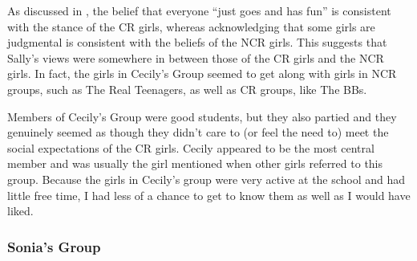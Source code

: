 \label{ex:sallyjudges}

\noindent As discussed in  , the belief that everyone ``just goes and has fun'' is consistent with the stance of the CR girls, whereas acknowledging that some girls are judgmental is consistent with the beliefs of the NCR girls. This suggests that Sally's views were somewhere in between those of the CR girls and the NCR girls.  In fact, the girls in Cecily's Group seemed to get along with girls in NCR groups, such as The Real Teenagers, as well as CR groups, like The BBs. 

Members of Cecily's Group were good students, but they also partied and they genuinely seemed as though they didn't care to (or feel the need to) meet the social expectations of the CR girls. Cecily appeared to be the most central member and was usually the girl mentioned when other girls referred to this group. Because the girls in Cecily's group were very active at the school and had little free time, I had less of a chance to get to know them as well as I would have liked. 






\subsubsection{Sonia's Group}


